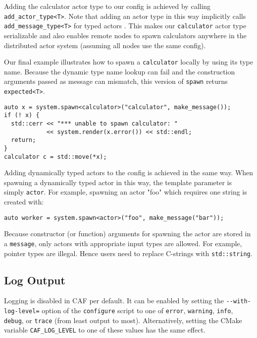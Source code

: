 
Adding the calculator actor type to our config is achieved by calling
\lstinline^add_actor_type<T>^. Note that adding an actor type in this way
implicitly calls \lstinline^add_message_type<T>^ for typed actors
. This makes our \lstinline^calculator^ actor type
serializable and also enables remote nodes to spawn calculators anywhere in the
distributed actor system (assuming all nodes use the same config).


Our final example illustrates how to spawn a \lstinline^calculator^ locally by
using its type name. Because the dynamic type name lookup can fail and the
construction arguments passed as message can mismatch, this version of
\lstinline^spawn^ returns \lstinline^expected<T>^.

\begin{lstlisting}
auto x = system.spawn<calculator>("calculator", make_message());
if (! x) {
  std::cerr << "*** unable to spawn calculator: "
            << system.render(x.error()) << std::endl;
  return;
}
calculator c = std::move(*x);
\end{lstlisting}

Adding dynamically typed actors to the config is achieved in the same way. When
spawning a dynamically typed actor in this way, the template parameter is
simply \lstinline^actor^. For example, spawning an actor "foo" which requires
one string is created with:

\begin{lstlisting}
auto worker = system.spawn<actor>("foo", make_message("bar"));
\end{lstlisting}

Because constructor (or function) arguments for spawning the actor are stored
in a \lstinline^message^, only actors with appropriate input types are allowed.
For example, pointer types are illegal. Hence users need to replace C-strings
with \lstinline^std::string^.

\clearpage
\subsection{Log Output}
\label{log-output}

Logging is disabled in CAF per default. It can be enabled by setting the
\lstinline^--with-log-level=^ option of the \lstinline^configure^ script to one
of \lstinline^error^, \lstinline^warning^, \lstinline^info^, \lstinline^debug^,
or \lstinline^trace^ (from least output to most). Alternatively, setting the
CMake variable \lstinline^CAF_LOG_LEVEL^ to one of these values has the same
effect.

